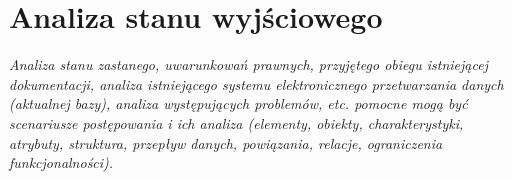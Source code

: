 \section{Analiza stanu wyjściowego}


\textit{Analiza stanu zastanego, uwarunkowań prawnych, przyjętego
obiegu istniejącej dokumentacji, analiza istniejącego systemu elektronicznego
przetwarzania danych (aktualnej bazy), analiza występujących problemów, etc. pomocne
mogą być scenariusze postępowania i ich analiza (elementy, obiekty, charakterystyki,
atrybuty, struktura, przepływ danych, powiązania, relacje, ograniczenia funkcjonalności).} \\

